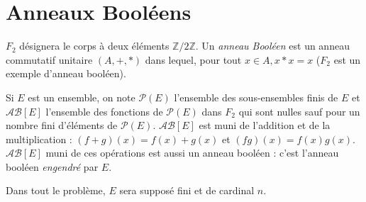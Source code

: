 \section{Anneaux Booléens}

$F_2$ désignera le corps à deux éléments $\mathbb{Z}/2\mathbb{Z}$. Un \textit{anneau Booléen} est un anneau commutatif unitaire $(A, +, *)$ dans lequel, pour tout $x\in A, x*x=x$ ($F_2$ est un exemple d'anneau booléen).
\medskip

Si $E$ est un ensemble, on note $\mathcal{P}(E)$ l'ensemble des sous-ensembles finis de $E$ et $\mathcal{AB}[E]$ l'ensemble des fonctions de $\mathcal{P}(E)$ dans $F_2$ qui sont nulles sauf pour un nombre fini d'éléments de $\mathcal{P}(E)$. $\mathcal{AB}[E]$ est muni de l'addition et de la multiplication : $(f+g)(x)=f(x)+g(x)$ et $(fg)(x)=f(x)g(x)$. $\mathcal{AB}[E]$ muni de ces opérations est aussi un anneau booléen : c'est l'anneau booléen \textit{engendré} par $E$.
\medskip

Dans tout le problème, $E$ sera supposé fini et de cardinal $n$.


